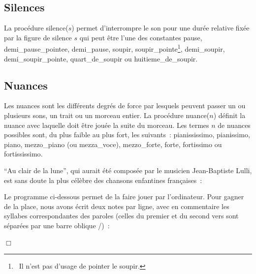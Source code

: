 \subsection{Silences}

La procédure {\idt silence($s$)} permet d'interrompre le son pour une durée re\-la\-ti\-ve fixée par
la figure de silence $s$ qui peut être l'une des constantes
  {\idt pause},
  {\idt demi\_pause\_pointee},
  {\idt demi\_pause},
  {\idt soupir},
  {\idt sou\-pir\_\-poin\-te}\footnote{\ Il n'est pas d'usage de pointer le soupir.},
  {\idt de\-mi\_\-sou\-pir},
  {\idt demi\_soupir\_pointe},
  {\idt quart\_de\_soupir}
ou  {\idt huitieme\_de\_soupir}.

\subsection{Nuances}

Les nuances sont les différents degrés de force par lesquels peuvent passer un ou plusieurs sons, un trait
ou un morceau entier. La procédure {\idt nuance($n$)} définit la nuance avec laquelle doit être jouée
la suite du morceau. Les termes $n$ de nuances possibles sont, du plus faible au plus fort, les suivants~:
{\idt pia\-nis\-sis\-si\-mo},
{\idt pia\-nis\-si\-mo},
{\idt piano},
{\idt mezzo\_piano} (ou {\idt mezza\_voce}),
{\idt mezzo\_forte},
{\idt forte},
{\idt fortissimo} ou
{\idt for\-tis\-sis\-si\-mo}.

\begin{exemple}{\rm
``Au clair de la lune'', qui aurait été composée par le musicien Jean-Baptiste Lulli,
est sans doute la plus célèbre des chansons enfantines françaises~:



\noindent Le programme ci-dessous permet de la faire jouer par l'ordinateur. Pour
gagner de la place, nous avons écrit deux notes par ligne, avec en commentaire les syllabes
correspondantes des paroles (celles du premier et du second vers sont séparées par une barre
oblique {\cmt /})~:

 
\noindent $\Box$ }\end{exemple}



